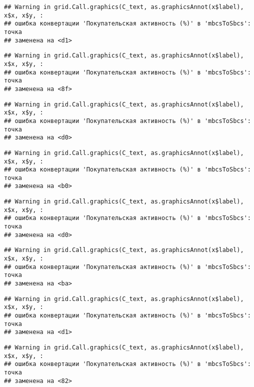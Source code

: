 \documentclass[
]{article}
\begin{document}
\begin{verbatim}
## Warning in grid.Call.graphics(C_text, as.graphicsAnnot(x$label), x$x, x$y, :
## ошибка конвертации 'Покупательская активность (%)' в 'mbcsToSbcs': точка
## заменена на <d1>
\end{verbatim}

\begin{verbatim}
## Warning in grid.Call.graphics(C_text, as.graphicsAnnot(x$label), x$x, x$y, :
## ошибка конвертации 'Покупательская активность (%)' в 'mbcsToSbcs': точка
## заменена на <8f>
\end{verbatim}

\begin{verbatim}
## Warning in grid.Call.graphics(C_text, as.graphicsAnnot(x$label), x$x, x$y, :
## ошибка конвертации 'Покупательская активность (%)' в 'mbcsToSbcs': точка
## заменена на <d0>
\end{verbatim}

\begin{verbatim}
## Warning in grid.Call.graphics(C_text, as.graphicsAnnot(x$label), x$x, x$y, :
## ошибка конвертации 'Покупательская активность (%)' в 'mbcsToSbcs': точка
## заменена на <b0>
\end{verbatim}

\begin{verbatim}
## Warning in grid.Call.graphics(C_text, as.graphicsAnnot(x$label), x$x, x$y, :
## ошибка конвертации 'Покупательская активность (%)' в 'mbcsToSbcs': точка
## заменена на <d0>
\end{verbatim}

\begin{verbatim}
## Warning in grid.Call.graphics(C_text, as.graphicsAnnot(x$label), x$x, x$y, :
## ошибка конвертации 'Покупательская активность (%)' в 'mbcsToSbcs': точка
## заменена на <ba>
\end{verbatim}

\begin{verbatim}
## Warning in grid.Call.graphics(C_text, as.graphicsAnnot(x$label), x$x, x$y, :
## ошибка конвертации 'Покупательская активность (%)' в 'mbcsToSbcs': точка
## заменена на <d1>
\end{verbatim}

\begin{verbatim}
## Warning in grid.Call.graphics(C_text, as.graphicsAnnot(x$label), x$x, x$y, :
## ошибка конвертации 'Покупательская активность (%)' в 'mbcsToSbcs': точка
## заменена на <82>
\end{verbatim}
\end{document}
